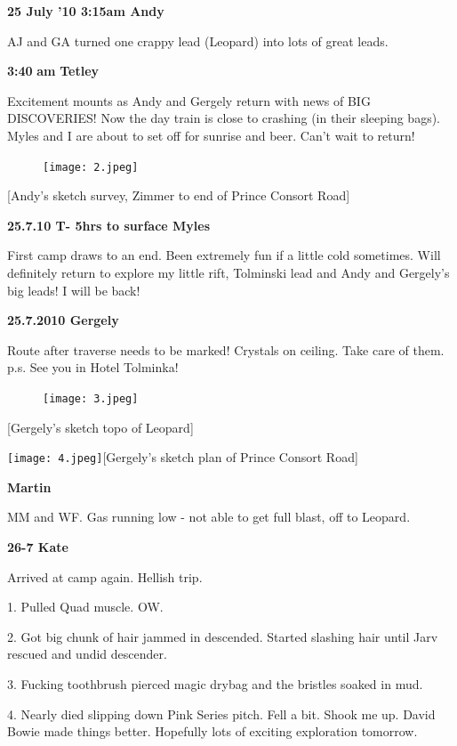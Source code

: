 \textbf{25 July '10 3:15am Andy}

AJ and GA turned one crappy lead (Leopard) into lots of great leads.

\textbf{3:40} \textbf{am} \textbf{Tetley}

Excitement mounts as Andy and Gergely return with news of BIG
DISCOVERIES! Now the day train is close to crashing (in their sleeping
bags). Myles and I are about to set off for sunrise and beer. Can't wait
to return!

\begin{figure}[htbp]
\centering
\texttt{[image: 2.jpeg]}
\caption{}
\end{figure}

{[}Andy's sketch survey, Zimmer to end of Prince Consort Road{]}

\textbf{25.7.10 T- 5hrs to surface Myles}

First camp draws to an end. Been extremely fun if a little cold
sometimes. Will definitely return to explore my little rift, Tolminski
lead and Andy and Gergely's big leads! I will be back!

\textbf{25.7.2010 Gergely}

Route after traverse needs to be marked! Crystals on ceiling. Take care
of them. p.s. See you in Hotel Tolminka!

\begin{figure}[htbp]
\centering
\texttt{[image: 3.jpeg]}
\caption{}
\end{figure}

{[}Gergely's sketch topo of Leopard{]}

\texttt{[image: 4.jpeg]}{[}Gergely's sketch plan of Prince Consort
Road{]}

\textbf{Martin}

MM and WF. Gas running low - not able to get full blast, off to Leopard.

\textbf{26-7 Kate}

Arrived at camp again. Hellish trip.

1. Pulled Quad muscle. OW.

2. Got big chunk of hair jammed in descended. Started slashing hair
until Jarv rescued and undid descender.

3. Fucking toothbrush pierced magic drybag and the bristles soaked in
mud.

4. Nearly died slipping down Pink Series pitch. Fell a bit. Shook me up.
David Bowie made things better. Hopefully lots of exciting exploration
tomorrow.

